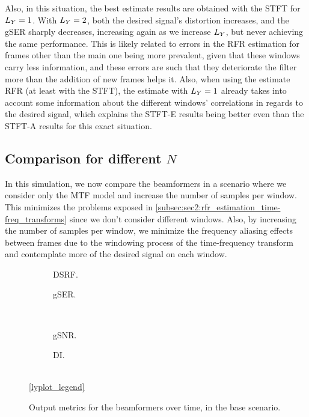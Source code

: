 Also, in this situation, the best estimate results are obtained with the STFT for $\Ly = 1$. With $\Ly = 2$, both the desired signal's distortion increases, and the gSER sharply decreases, increasing again as we increase $\Ly$, but never achieving the same performance. This is likely related to errors in the RFR estimation for frames other than the main one being more prevalent, given that these windows carry less information, and these errors are such that they deteriorate the filter more than the addition of new frames helps it. Also, when using the estimate RFR (at least with the STFT), the estimate with $\Ly = 1$ already takes into account some information about the different windows' correlations in regards to the desired signal, which explains the STFT-E results being better even than the STFT-A results for this exact situation.


\subsection{Comparison for different $N$}

In this simulation, we now compare the beamformers in a scenario where we consider only the MTF model and increase the number of samples per window. This minimizes the problems exposed in \cref{subsec:sec2:rfr_estimation_time-freq_transforms} since we don't consider different windows. Also, by increasing the number of samples per window, we minimize the frequency aliasing effects between frames due to the windowing process of the time-frequency transform and contemplate more of the desired signal on each window.
\begin{figure}[!ht]
	\centering
	\begin{subfigure}{0.49\textwidth}
		\centering
		
		\caption{DSRF.}
		\label{subfig:lineplot__DSRF__N_var__iSER_n15__Ly_1}
	\end{subfigure}\hfill
	\begin{subfigure}{0.49\textwidth}
		\centering
		
		\caption{gSER.}
		\label{subfig:lineplot__gSER__N_var__iSER_n15__Ly_1}
	\end{subfigure}\\[1em]
	\begin{subfigure}{0.49\textwidth}
		\centering
		
		\caption{gSNR.}
		\label{subfig:lineplot__gSNR__N_var__iSER_n15__Ly_1}
	\end{subfigure}\hfill
	\begin{subfigure}{0.49\textwidth}
		\centering
		
		\caption{DI.}
		\label{subfig:lineplot__DI__N_var__iSER_n15__Ly_1}
	\end{subfigure}\\[1em]
	\ref*{lyplot_legend}
	\caption{Output metrics for the beamformers over time, in the base scenario.}
	\label{fig:lineplot__N_var__iSER_n15__Ly_1}
\end{figure}

